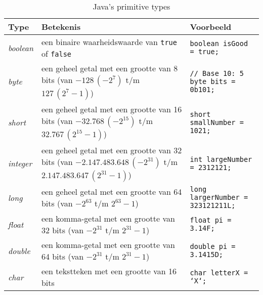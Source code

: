 \documentclass[dutch,a4paper,12pt,doubleside]{book}
\begin{document}
\begin{table}[H]
    \centering
    \begin{tabularx}{\textwidth}{
        |>{\raggedright}l|>{\raggedright}X|>{\raggedright\arraybackslash}X|
    }
    \hline
    \textbf{Type} & \textbf{Betekenis} & \textbf{Voorbeeld} \\ \hline
        \textit{boolean}
        & een binaire waarheidswaarde van \texttt{true} of \texttt{false}
        & \texttt{boolean isGood = true;} \\ \hline
        \textit{byte}
        & een geheel getal met een grootte van 8 bits \newline 
        (van \(-128\, (-2^7)\) t/m \(127\, (2^7 - 1)\))
        & \texttt{// Base 10: 5} \newline \texttt{byte bits = 0b101;} \\ \hline
        \textit{short}
        & een geheel getal met een grootte van 16 bits \newline
        (van \(-32.768\, (-2^{15})\) t/m \(32.767\, (2^{15} - 1)\))
        & \texttt{short smallNumber = 1021;} \\ \hline
        \textit{integer}
        & een geheel getal met een grootte van 32 bits \newline
        (van \(-2.147.483.648\, (-2^{31})\) t/m \(2.147.483.647\, (2^{31} - 1)\))
        & \texttt{int largeNumber = 2312121;} \\ \hline
        \textit{long}
        & een geheel getal met een grootte van 64 bits \newline
        (van \(-2^{63}\) t/m \(2^{63} - 1\))
        & \texttt{long largerNumber = 323121211L;} \\ \hline
        \textit{float}
        & een komma-getal met een grootte van 32 bits \newline
        (van \(-2^{31}\) t/m \(2^{31} - 1\))
        & \texttt{float pi = 3.14F;} \\ \hline
        \textit{double}
        & een komma-getal met een grootte van 64 bits \newline
        (van \(-2^{31}\) t/m \(2^{31} - 1\))
        & \texttt{double pi = 3.1415D;} \\ \hline
        \textit{char}
        & een tekstteken met een grootte van 16 bits
        & \texttt{char letterX = `X`;} \\ \hline
    \end{tabularx}
    \caption{Java's primitive types}
    \label{table:primitive-types}
    \centering
\end{table}
\end{document}
